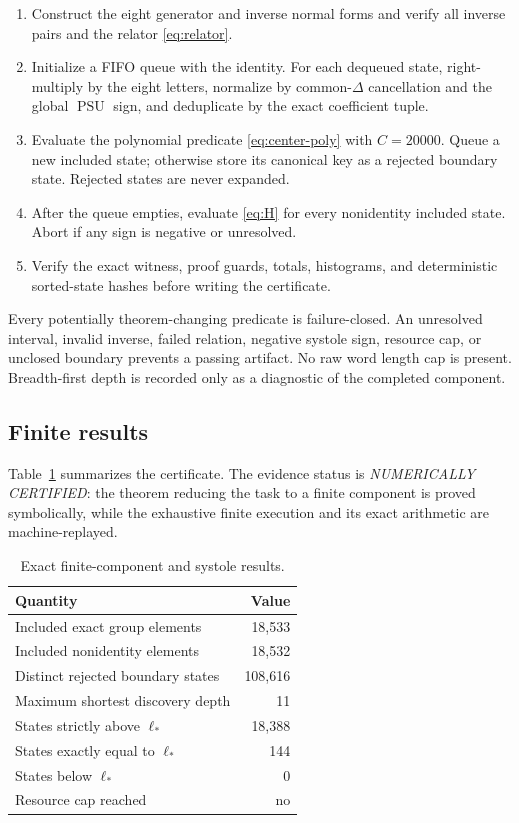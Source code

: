 \documentclass[11pt,a4paper]{article}
\theoremstyle{definition}
\newcommand{\PSU}{\operatorname{PSU}}
\newcommand{\length}{\ell}
\begin{document}
\begin{enumerate}[leftmargin=*,label=\arabic*.]
 \item Construct the eight generator and inverse normal forms and verify all
       inverse pairs and the relator \eqref{eq:relator}.
 \item Initialize a FIFO queue with the identity.  For each dequeued state,
       right-multiply by the eight letters, normalize by common-\(\Delta\)
       cancellation and the global \(\PSU\) sign, and deduplicate by the exact
       coefficient tuple.
 \item Evaluate the polynomial predicate \eqref{eq:center-poly} with
       \(C=20000\).  Queue a new included state; otherwise store its canonical
       key as a rejected boundary state.  Rejected states are never expanded.
 \item After the queue empties, evaluate \eqref{eq:H} for every nonidentity
       included state.  Abort if any sign is negative or unresolved.
 \item Verify the exact witness, proof guards, totals, histograms, and
       deterministic sorted-state hashes before writing the certificate.
\end{enumerate}

Every potentially theorem-changing predicate is failure-closed.  An
unresolved interval, invalid inverse, failed relation, negative systole sign,
resource cap, or unclosed boundary prevents a passing artifact.  No raw word
length cap is present.  Breadth-first depth is recorded only as a diagnostic
of the completed component.

\subsection{Finite results}

Table~\ref{tab:results} summarizes the certificate.  The evidence status is
\emph{NUMERICALLY CERTIFIED}: the theorem reducing the task to a finite
component is proved symbolically, while the exhaustive finite execution and
its exact arithmetic are machine-replayed.

\begin{table}[htbp]
\centering
\caption{Exact finite-component and systole results.}
\label{tab:results}
\begin{tabular}{@{}lr@{}}
\toprule
Quantity & Value\\
\midrule
Included exact group elements & 18,533\\
Included nonidentity elements & 18,532\\
Distinct rejected boundary states & 108,616\\
Maximum shortest discovery depth & 11\\
States strictly above \(\length_*\) & 18,388\\
States exactly equal to \(\length_*\) & 144\\
States below \(\length_*\) & 0\\
Resource cap reached & no\\
\bottomrule
\end{tabular}
\end{table}
\end{document}
